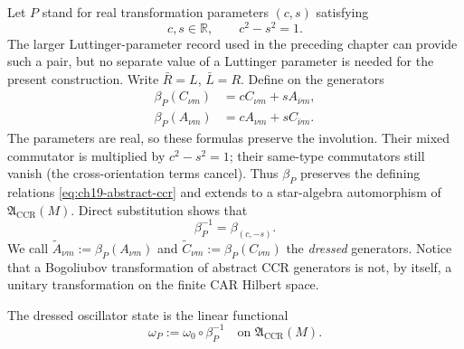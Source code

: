 Let $P$ stand for real transformation parameters $(c,s)$ satisfying
\begin{equation}
 c,s\in\mathbb R,\qquad c^2-s^2=1.
 \label{eq:ch19-hyperbolic}
\end{equation}
The larger Luttinger-parameter record used in the preceding chapter can
provide such a pair, but no separate value of a Luttinger parameter is
needed for the present construction.  Write $\bar R=L$, $\bar L=R$.
Define on the generators
\begin{align}
 \beta_P(C_{\nu m})&=cC_{\nu m}+sA_{\bar\nu m},
 \label{eq:ch19-bogoliubov-creator}\\
 \beta_P(A_{\nu m})&=cA_{\nu m}+sC_{\bar\nu m}.
 \label{eq:ch19-bogoliubov-annihilator}
\end{align}
The parameters are real, so these formulas preserve the involution.
Their mixed commutator is multiplied by $c^2-s^2=1$; their
same-type commutators still vanish (the cross-orientation terms cancel).
Thus $\beta_P$ preserves the defining relations
\eqref{eq:ch19-abstract-ccr} and extends to a star-algebra
automorphism of $\mathfrak A_{\mathrm{CCR}}(M)$.  Direct substitution
shows that
\begin{equation}
 \beta_P^{-1}=\beta_{(c,-s)}.
 \label{eq:ch19-inverse-beta}
\end{equation}
We call $\widetilde A_{\nu m}:=\beta_P(A_{\nu m})$ and
$\widetilde C_{\nu m}:=\beta_P(C_{\nu m})$ the \emph{dressed}
generators.  Notice that a Bogoliubov transformation of abstract
CCR generators is not, by itself, a unitary transformation on the
finite CAR Hilbert space.

\begin{definition}
\label{def:ch19-dressed-functional}
The dressed oscillator state is the linear functional
\begin{equation}
  \boxed{\displaystyle
  \omega_P:=\omega_0\circ\beta_P^{-1}}
  \quad\text{on }\mathfrak A_{\mathrm{CCR}}(M).
  \label{eq:ch19-dressed-state}
\end{equation}
\end{definition}

